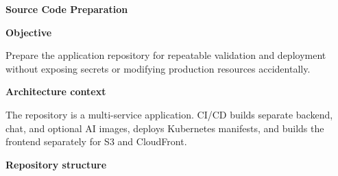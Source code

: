 \vspace{0.5em}\noindent\textbf{Source Code Preparation}\par

\vspace{0.5em}\noindent\textbf{Objective}\par

Prepare the application repository for repeatable validation and
deployment without exposing secrets or modifying production resources
accidentally.

\vspace{0.5em}\noindent\textbf{Architecture context}\par

The repository is a multi-service application. CI/CD builds separate
backend, chat, and optional AI images, deploys Kubernetes manifests, and
builds the frontend separately for S3 and CloudFront.

\vspace{0.5em}\noindent\textbf{Repository structure}\par

